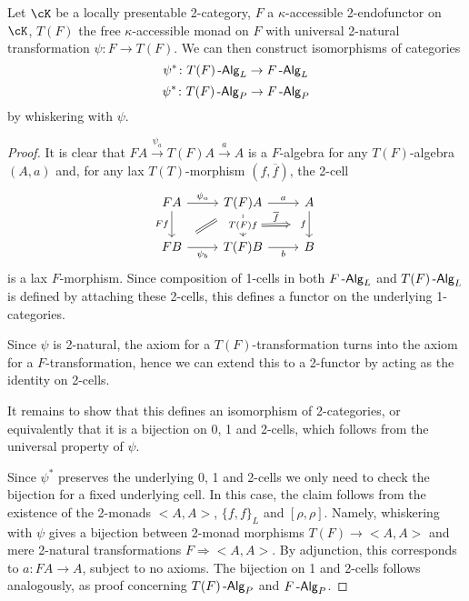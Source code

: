 \documentclass[a4paper,11pt,oneside,openany]{scrbook}
\begin{document}
\begin{prop}
    Let $\cK$ be a locally presentable 2-category, $F$ a $\kappa$-accessible
    2-endofunctor on $\cK$, $T(F)$ the free $\kappa$-accessible monad on $F$
    with universal 2-natural transformation $\psi\colon F\rightarrow T(F)$. We
    can then construct isomorphisms of categories
    \[\psi^*\colon T(F)\operatorname{-\mathsf{Alg}}_L\rightarrow F\operatorname{-\mathsf{Alg}}_L\]
    \[\psi^*\colon T(F)\operatorname{-\mathsf{Alg}}_P\rightarrow F\operatorname{-\mathsf{Alg}}_P\]
    by whiskering with $\psi$.
\end{prop}
\begin{proof}
    It is clear that $FA\xrightarrow{\psi_a}T(F)A\xrightarrow{a}A$ is a
    $F$-algebra for any $T(F)$-algebra $(A,a)$ and, for any lax $T(T)$-morphism
    $(f,\overline{f})$, the 2-cell
    \[\begin{tikzcd}
        FA & {T(F)A} & A \\
        FB & {T(F)B} & B
        \arrow["b"', from=2-2, to=2-3]
        \arrow[""{name=0, anchor=center, inner sep=0}, "f"', from=1-3, to=2-3]
        \arrow["a", from=1-2, to=1-3]
        \arrow[""{name=1, anchor=center, inner sep=0}, "{T(F)f}"{description}, from=1-2, to=2-2]
        \arrow["Ff"', from=1-1, to=2-1]
        \arrow["{\psi_b}"', from=2-1, to=2-2]
        \arrow["{\psi_a}", from=1-1, to=1-2]
        \arrow[shorten <=8pt, shorten >=8pt, Rightarrow, no head, from=2-1, to=1-2]
        \arrow["{\overline{f}}", shorten <=14pt, shorten >=14pt, Rightarrow, from=1, to=0]
    \end{tikzcd}\]
    is a lax $F$-morphism. Since composition of 1-cells in both $F\operatorname{-\mathsf{Alg}}_L$ and
    $T(F)\operatorname{-\mathsf{Alg}}_L$ is defined by attaching these 2-cells, this defines a functor
    on the underlying 1-categories.

    Since $\psi$ is 2-natural, the axiom for a $T(F)$-transformation turns into
    the axiom for a $F$-transformation, hence we can extend this to a 2-functor
    by acting as the identity on 2-cells.

    It remains to show that this defines an isomorphism of 2-categories, or
    equivalently that it is a bijection on 0, 1 and 2-cells, which follows from
    the universal property of $\psi$.

    Since $\psi^*$ preserves the underlying 0, 1 and 2-cells we only need to
    check the bijection for a fixed underlying cell. In this case, the claim
    follows from the existence of the 2-monads $<A,A>$, $\{f,f\}_L$ and
    $[\rho,\rho]$. Namely, whiskering with $\psi$ gives a bijection between
    2-monad morphisms $T(F)\rightarrow<A,A>$ and mere 2-natural transformations
    $F\Rightarrow <A,A>$. By adjunction, this corresponds to $a\colon
    FA\rightarrow A$, subject to no axioms. The bijection on 1 and 2-cells
    follows analogously, as proof concerning $T(F)\operatorname{-\mathsf{Alg}}_P$ and $F\operatorname{-\mathsf{Alg}}_P$.
\end{proof}
\end{document}
